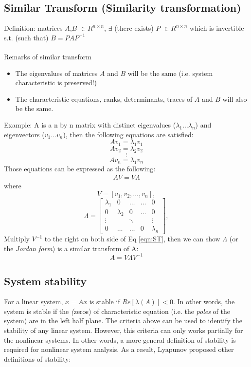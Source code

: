 \documentclass{article}
\begin{document}
\subsection{Similar Transform (Similarity transformation)}
Definition:  matrices $A$,$B$ $\in R^{n\times n}$, $\exists$ (there exists) $P$ $\in R^{n\times n}$ which is invertible s.t. (such that) $B=PAP^{-1}$\\\\
Remarks of similar transform
 \begin{itemize}
 \item The eigenvalues of matrices $A$ and $B$ will be the same (i.e. system characteristic is preserved!)
 \item The characteristic equations, ranks, determinants, traces of $A$ and $B$ will also be the same.
 \end{itemize}
Example:
A is a n by n matrix with distinct eigenvalues ($\lambda_1\ldots\lambda_n$) and eigenvectors ($v_1\ldots v_n$), then the following equations are satisfied:
\[Av_1=\lambda_1v_1\]
\[Av_2=\lambda_2v_2\]
\[\vdots\]
\[Av_n=\lambda_1v_n\]
Those equations can be expressed as the following:
\begin{align}
\label{eqn:ST}
AV=V\Lambda
\end{align}
where
\[V=[v_1,v_2,\ldots,v_n],\]
\[\Lambda=\left[ \begin{matrix}
   \lambda_1 &0 &\ldots &\ldots&0 \\
   0&\lambda_2 & 0&\ldots &0\\
   \vdots&&\ddots&&\vdots\\
   0&\ldots&\ldots&0&\lambda_n \end{matrix} \right],\]
Multiply $V^{-1}$ to the right on both side of Eq \eqref{eqn:ST}, then we can show $\Lambda$ (or the \emph{Jordan form}) is a similar transform of A:
\[A=V\Lambda V^{-1}\]

\subsection{System stability}
For a linear system, $\dot x=Ax$ is stable if $Re[\lambda (A)]<0$. In other words, the system is stable if the 
\emph(zeros) of characteristic equation (i.e. the \emph{poles} of the system) are in the left half plane.
The criteria above can be used to identify the stability of any linear system. However, this criteria can only works partially for the nonlinear systems. In other words, a more general definition of stability is required for nonlinear system analysis. As a result, Lyapunov proposed other definitions of stability:
\end{document}
